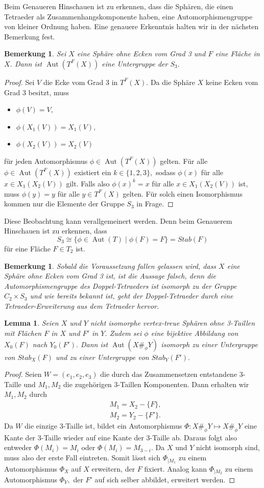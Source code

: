 \documentclass[12pt,titlepage,twoside,cleardoublepage]{article}
\theoremstyle{nummermitklammern}
\newtheorem{lemma}[temp]{Lemma}
\newtheorem{bemerkung}[temp]{Bemerkung}
\newtheorem{lemma}[zahl]{Lemma}
\newtheorem{bemerkung}[zahl]{Bemerkung}
\numberwithin{equation}{section}
\DeclareMathOperator{\Aut}{Aut}
\begin{document}
Beim Genaueren Hinschauen ist zu erkennen, dass die Sphären, die einen Tetraeder als Zusammenhangskomponente haben, eine Automorphismengruppe von kleiner Ordnung haben. Eine genauere Erkenntnis halten wir in der nächsten Bemerkung fest.
\begin{bemerkung}
Sei $X$ eine Sphäre ohne Ecken vom Grad 3 und $F$ eine Fläche in $X$. Dann ist $\Aut(T^F(X))$ eine Untergruppe der $S_3.$ 
\end{bemerkung}
\begin{proof}
Sei $V$ die Ecke vom Grad 3 in $T^F(X).$
Da die Sphäre $X$ keine Ecken vom Grad 3 besitzt, muss
\begin{itemize}
\item $\phi(V)=V,$
\item $\phi (X_1(V))=X_1(V),$
\item $\phi (X_2(V))=X_2(V)$
\end{itemize}
für jeden Automorphismus $\phi\in\Aut({T}^F(X))$ gelten. Für alle $\phi\in \Aut(T^F(X))$ existiert ein $k\in\{1,2,3\},$ sodass $\phi(x)$ für alle $x\in X_1(X_2(V))$ gilt. Falls also $\phi(x)^k=x$ für alle $x \in X_1(X_2(V))$ ist, muss $\phi(y)=y$ für alle $y\in T^F(X)$ gelten. Für solch einen Isomorphismus kommen nur die Elemente der Gruppe $S_3$ in Frage. 
\end{proof}
Diese Beobachtung kann verallgemeinert werden. Denn beim Genauerem Hinschauen ist zu erkennen, dass 
\[
S_3\cong\{\phi\in \Aut(T)\mid \phi(F)=F\}=Stab(F)
\] für eine Fläche $F\in T_2$ ist.
\begin{bemerkung}
Sobald die Voraussetzung fallen gelassen wird, dass $X$ eine Sphäre ohne Ecken vom Grad 3 ist, ist die Aussage falsch, denn die Automorphismengruppe des Doppel-Tetraeders ist isomorph zu der Gruppe $C_2\times S_3$ und wie bereits bekannt ist, geht der Doppel-Tetraeder durch eine Tetraeder-Erweiterung aus dem  Tetraeder hervor.
\end{bemerkung}
\begin{lemma}
Seien $X$ und $Y$ nicht isomorphe vertex-treue Sphären ohne 3-Taillen mit Flächen $F$ in $X$ und $F'$ in $Y$. Zudem sei $\phi$ eine bijektive Abbildung von $X_0(F)$ nach $Y_0(F').$ Dann ist $\Aut(X\#_\phi Y)$ isomorph zu einer Untergruppe von $Stab_X(F)$ und zu einer Untergruppe von $Stab_Y(F').$
\end{lemma}
\begin{proof}
Seien $W=(e_1,e_2,e_3)$ die durch das Zusammensetzen entstandene 3-Taille und $M_1,M_2$ die zugehörigen 3-Taillen Komponenten. Dann erhalten wir $M_1,M_2$ durch 
\begin{align*}
 &M_1=X_2-\{F\}, \\
 &M_2=Y_2-\{F'\}. 
 \end{align*}
 Da $W$ die einzige 3-Taille ist, bildet ein Automorphismus $\Phi:X\#_{\phi}Y \mapsto X\#_{\phi}Y$  eine Kante der 3-Taille wieder auf eine Kante der 3-Taille ab. Daraus folgt also entweder $\Phi(M_i)=M_i$ oder $\Phi(M_i)=M_{3-i}.$ Da $X$ und $Y$ nicht isomorph sind, muss also der erste Fall eintreten. Somit lässt sich \textsc{$\Phi_{\mid M_1}$} zu einem Automorphismus $\Phi_X$ auf $X$ erweitern, der $F$ fixiert. Analog kann $\Phi_{\mid M_2}$ zu einem Automorphismus $\Phi_Y,$ der $F'$ auf sich selber abbildet, erweitert werden.
\end{proof}
\end{document}
